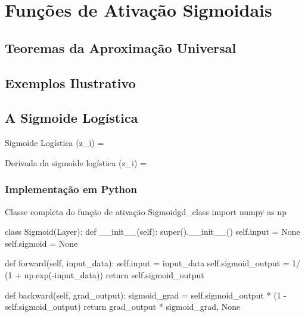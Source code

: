 
\chapter{Funções de Ativação Sigmoidais}
\label{cap:ativacao-sigmoidais}



\section{Teoremas da Aproximação Universal}

\section{Exemplos Ilustrativo}

\section{A Sigmoide Logística}

\begin{equacaodestaque}{Sigmoide Logística}
    \sigma(z_i) = 
    \label{eq:sigmoide}
\end{equacaodestaque}

\begin{equacaodestaque}{Derivada da sigmoide logística}
    \sigma(z_i) = 
    \label{eq:sigmoide-derivada}
\end{equacaodestaque}

\subsection{Implementação em Python}

\begin{codelisting}{Classe completa do função de ativação Sigmoid}{gd_class}
import numpy as np

class Sigmoid(Layer):
    def __init__(self):
        super().__init__()
        self.input = None
        self.sigmoid = None

    def forward(self, input_data):
        self.input = input_data
        self.sigmoid_output = 1/ (1 + np.exp(-input_data))
        return self.sigmoid_output

    def backward(self, grad_output):
        sigmoid_grad = self.sigmoid_output * (1 - self.sigmoid_output)
        return grad_output * sigmoid_grad, None
\end{codelisting}

